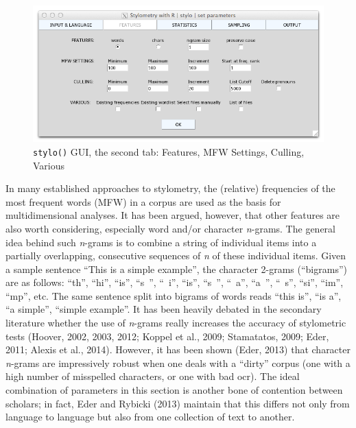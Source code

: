 \documentclass[11pt,a4paper]{article}
\def\code#1{{\tt #1}}
\begin{document}
\begin{figure}
  \centering
  \includegraphics[width=0.8\linewidth]{img/stylo-gui_tab2.png}
  \caption{\code{stylo()} GUI, the second tab: Features, MFW Settings, Culling, Various}
\end{figure}

In many established approaches to stylometry, the (relative) frequencies
of the most frequent words (MFW) in a corpus are used as the basis
for multidimensional analyses. It has been argued, however, that other
features are also worth considering, especially word and/or character
\emph{n}-grams. The general idea behind such \emph{n}-grams is to
combine a string of individual items into a partially overlapping,
consecutive sequences of \textit{n} of these individual items. Given a sample
sentence “This is a simple example”, the character 2-grams (``bigrams'')
are as follows: “th”, “hi”, “is”, “s~”, “~i”, “is”, “s~”, “~a”, “a~”, “~s”, 
“si”, “im”, “mp”, etc. The same sentence split into bigrams
of words reads “this is”, “is a”, “a simple”, “simple example”. It
has been heavily debated in the secondary literature whether the use
of \emph{n}-grams really increases the accuracy of stylometric tests
(Hoover, 2002, 2003, 2012; Koppel et al., 2009; Stamatatos, 2009;
Eder, 2011; Alexis et al., 2014). However, it has been shown (Eder,
2013) that character \emph{n}-grams are impressively robust when one
deals with a ``dirty'' corpus (one with a high number of misspelled
characters, or one with bad {\sc ocr}). The ideal combination of parameters
in this section is another bone of contention between scholars; in
fact, Eder and Rybicki (2013) maintain that this differs not only
from language to language but also from one collection of text to
another.
\end{document}
